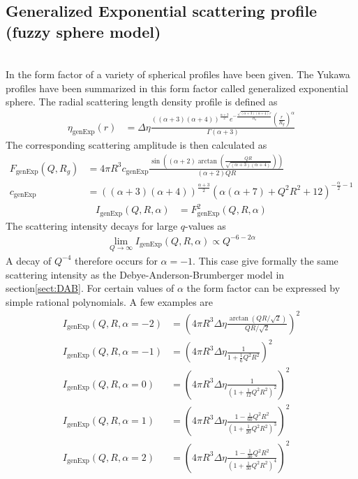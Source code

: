 \subsection{Generalized Exponential scattering profile (fuzzy sphere model)}
\label{sect:genExprSphere} ~\\

In \cite{Hofstadter1956} the form factor of a variety of spherical profiles have been given. The Yukawa profiles  have been summarized in this form factor called generalized exponential sphere. The radial scattering length density profile is defined as
\begin{align}
\eta_\mathrm{genExp}(r)&= \Delta\eta \frac{((\alpha +3) (\alpha +4))^{\frac{\alpha +3}{2}} e^{-\frac{\sqrt{(\alpha +3) (\alpha +4)} r}{R_g}}
   \left(\frac{r}{R_g}\right)^{\alpha }}{\Gamma (\alpha +3)}
\end{align}
The corresponding scattering amplitude is then calculated as
\begin{align}
  F_\mathrm{genExp}(Q,R_g) &= 4\pi R^3 c_\mathrm{genExp} \frac{\sin\left((\alpha+2)\arctan\left(\frac{Q R}{\sqrt{(\alpha+3)(\alpha+4)}}\right)\right)}{(\alpha+2)QR} \\
  c_\mathrm{genExp} &= ((\alpha+3)(\alpha+4))^{\frac{\alpha+3}{2}} \left(\alpha(\alpha+7)+Q^2R^2+12\right)^{-\frac{\alpha }{2}-1}
\end{align}
\begin{align}
  I_\mathrm{genExp}(Q,R,\alpha) &= F^2_\mathrm{genExp}(Q,R,\alpha)
\end{align}
The scattering intensity decays for large $q$-values as
\begin{align}
\lim_{Q\rightarrow\infty} I_\mathrm{genExp}(Q,R,\alpha) \propto Q^{-6-2\alpha}
\end{align}
A decay of $Q^{-4}$  therefore occurs for $\alpha=-1$. This case give formally the same scattering intensity as the Debye-Anderson-Brumberger model in section\ref{sect:DAB}.
For certain values of $\alpha$ the form factor can be expressed by simple rational polynomials. A few examples are
\begin{align}
 I_\mathrm{genExp}(Q,R,\alpha=-2) &= \left(4\pi R^3\Delta\eta\frac{\arctan\left(QR/\sqrt{2}\right)}{QR/\sqrt{2}} \right)^2\\
 I_\mathrm{genExp}(Q,R,\alpha=-1) &= \left(4\pi R^3\Delta\eta\frac{1}{1+\frac{1}{6}Q^2R^2} \right)^2\\
 I_\mathrm{genExp}(Q,R,\alpha=0) &= \left(4\pi R^3\Delta\eta\frac{1}{\left(1+\frac{1}{12}Q^2R^2\right)^2} \right)^2\\
 I_\mathrm{genExp}(Q,R,\alpha=1) &= \left(4\pi R^3\Delta\eta\frac{1-\frac{1}{60}Q^2R^2}{\left(1+\frac{1}{20}Q^2R^2\right)^3} \right)^2 \\
  I_\mathrm{genExp}(Q,R,\alpha=2) &=\left(4\pi R^3\Delta\eta\frac{1-\frac{1}{30}Q^2R^2}{\left(1+\frac{1}{30}Q^2R^2\right)^4} \right)^2
\end{align}

